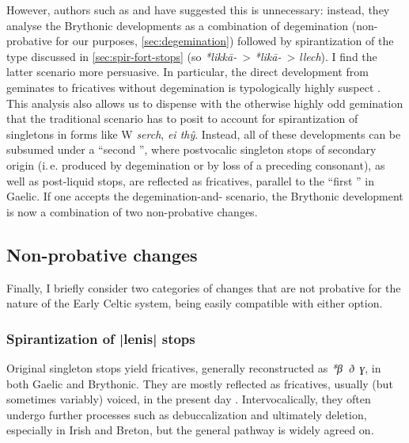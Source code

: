 \documentclass[output=paper,colorlinks,citecolor=brown]{langscibook}
\begin{document}
However, authors such as \textcite{thomasa, sims-williams1990dating, sims-williams08} and \textcite{mccone} have suggested this is unnecessary: instead, they analyse the Brythonic developments as a combination of  degemination (non\hyp probative for our purposes, \cref{sec:degemination}) followed by spirantization of the type discussed in \cref{sec:spir-fort-stops} (so \textit{*likkā-}~> \textit{*likā-}~> \textit{llech}). I find the latter scenario more persuasive. In particular, the direct development from geminates to fricatives without degemination is typologically highly suspect \parencite[e.\,g.][]{kirchner}. This analysis also allows us to dispense with the otherwise highly odd gemination that the traditional scenario has to posit to account for spirantization of singletons in forms like W \textit{serch}, \textit{ei thŷ}. Instead, all of these developments can be subsumed under a \enquote{second }, where postvocalic singleton  stops of secondary origin (i.\,e. produced by degemination or by loss of a preceding consonant), as well as post\hyp liquid stops, are reflected as  fricatives, parallel to the \enquote{first } in Gaelic. If one accepts the degemination\hyp and\hyp {} scenario, the Brythonic development is now a combination of two non\hyp probative changes.

\subsection{Non-probative changes}
\label{sec:non-prob-chang}

Finally, I briefly consider two categories of changes that are not probative for the nature of the Early Celtic system, being easily compatible with either option.

\subsubsection{Spirantization of |lenis| stops}
\label{sec:lenition}

Original  singleton stops yield  fricatives, generally reconstructed as \textit{*β~ð~ɣ}, in both Gaelic and Brythonic. They are mostly reflected as fricatives, usually (but sometimes variably) voiced, in the present day \parencite{ball01:_welsh_phonet}. Intervocalically, they often undergo further  processes such as debuccalization and ultimately deletion, especially in Irish and Breton, but the general pathway is widely agreed on.
\end{document}
